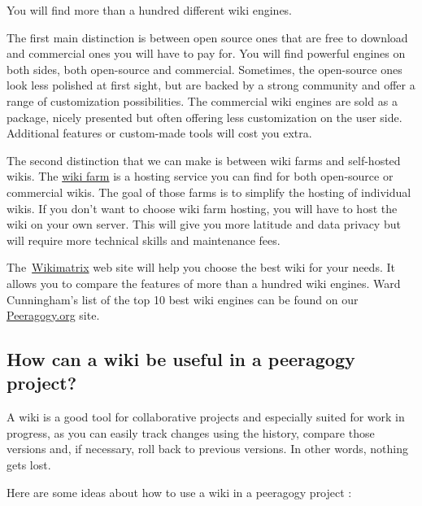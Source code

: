 You will find more than a hundred different wiki engines.

The first main distinction is between open source ones that are free to
download and commercial ones you will have to pay for. You will find
powerful engines on both sides, both open-source and commercial.
Sometimes, the open-source ones look less polished at first sight, but
are backed by a strong community and offer a range of customization
possibilities. The commercial wiki engines are sold as a package, nicely
presented but often offering less customization on the user side.
Additional features or custom-made tools will cost you extra.

The second distinction that we can make is between wiki farms and
self-hosted wikis. The
\href{http://en.wikipedia.org/wiki/Wiki_hosting_service}{wiki farm} is a
hosting service you can find for both open-source or commercial wikis.
The goal of those farms is to simplify the hosting of individual wikis.
If you don't want to choose wiki farm hosting, you will have to host the
wiki on your own server. This will give you more latitude and data
privacy but will require more technical skills and maintenance fees.

The~\href{http://www.wikimatrix.org/}{Wikimatrix} web site will help you
choose the best wiki for your needs. It allows you to compare the
features of more than a hundred wiki engines. Ward Cunningham's list of
the top 10 best wiki engines can be found on our
\href{http://c2.com/cgi/wiki?TopTenWikiEngines}{Peeragogy.org} site.

\hypertarget{how-can-a-wiki-be-useful-in-a-peeragogy-project}{%
\subsection{How can a wiki be useful in a peeragogy
project?}\label{how-can-a-wiki-be-useful-in-a-peeragogy-project}}

A wiki is a good tool for collaborative projects and especially suited
for work in progress, as you can easily track changes using the history,
compare those versions and, if necessary, roll back to previous
versions. In other words, nothing gets lost.

Here are some ideas about how to use a wiki in a peeragogy project :

